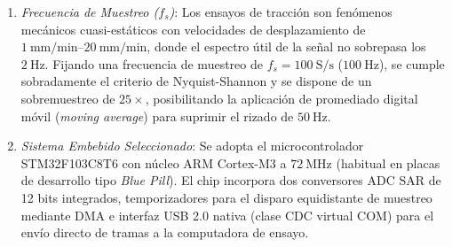 \begin{enumerate}
    \item \emph{Frecuencia de Muestreo ($f_s$)}: Los ensayos de tracción son fenómenos mecánicos cuasi-estáticos con
    velocidades de desplazamiento de $\qtyrange{1}{20}{\milli\meter/\minute}$, donde el espectro útil de la señal no
    sobrepasa los $\qty{2}{\hertz}$. Fijando una frecuencia de muestreo de $f_s = \qty{100}{\text{S/s}}$
    ($\qty{100}{\hertz}$), se cumple sobradamente el criterio de Nyquist-Shannon y se dispone de un
    sobremuestreo de $25\times$, posibilitando la aplicación de promediado digital móvil (\emph{moving
    average}) para suprimir el rizado de $\qty{50}{\hertz}$.
    \item \emph{Sistema Embebido Seleccionado}: Se adopta el microcontrolador STM32F103C8T6 con núcleo ARM Cortex-M3 a
    $\qty{72}{\mega\hertz}$ (habitual en placas de desarrollo tipo \emph{Blue Pill}). El chip incorpora dos conversores ADC SAR de 12 bits integrados, temporizadores para el disparo equidistante de muestreo mediante DMA e interfaz USB 2.0 nativa (clase CDC virtual COM) para el envío directo de tramas a la computadora de ensayo.
\end{enumerate}

